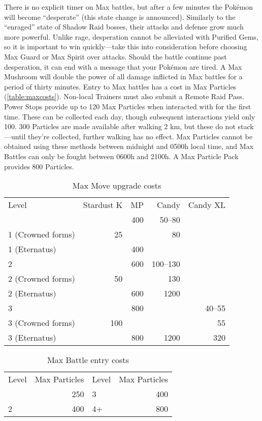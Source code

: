 There is no explicit timer on Max battles, but after a few minutes the Pokémon
  will become ``desperate'' (this state change is announced).
Similarly to the ``enraged'' state of Shadow Raid bosses, their attacks and
  defense grow much more powerful.
Unlike rage, desperation cannot be alleviated with Purified Gems, so it
  is important to win quickly---take this into consideration before choosing Max Guard or Max Spirit over attacks.
Should the battle continue past desperation, it can end with a message that
  your Pokémon are tired.
A Max Mushroom will double the power of all damage inflicted in
  Max battles for a period of thirty minutes.
Entry to Max battles has a cost in Max Particles (\autoref{table:maxcosts}).
Non-local Trainers must also submit a Remote Raid Pass.
Power Stops provide up to 120 Max Particles when interacted with for the first time.
These can be collected each day, though subsequent interactions yield only 100.
300 Particles are made available after walking 2 km, but these do not stack---until
 they're collected, further walking has no effect.
Max Particles cannot be obtained using these methods between midnight and 0500h local time,
  and Max Battles can only be fought between 0600h and 2100h.
A Max Particle Pack provides 800 Particles.
\begin{table}
\centering
\begin{tabular}{lrrrr}
Level             & Stardust K & MP  & Candy     & Candy XL\\
\Midrule
1                 &            & 400 & 50--80    &\\
1 (Crowned forms) & 25         &     & 80        &\\
1 (Eternatus)     &            & 400 &         &\\
2                 &            & 600 & 100--130  &\\
2 (Crowned forms) & 50         &     & 130       &\\
2 (Eternatus)     &            & 600 & 1200      &\\
3                 &            & 800 &           & 40--55\\
3 (Crowned forms) & 100        &     &           & 55\\
3 (Eternatus)     &            & 800 & 1200      & 320\\
\end{tabular}
\caption{Max Move upgrade costs\label{table:maxupgrades}}
\end{table}
\begin{table}
\centering
\begin{tabular}{lr|lr}
Level & Max Particles & Level & Max Particles\\
\Midrule
1 & 250 & 3 & 400\\
2 & 400 & 4+ & 800\\
\end{tabular}
\caption{Max Battle entry costs\label{table:maxcosts}}
\end{table}
